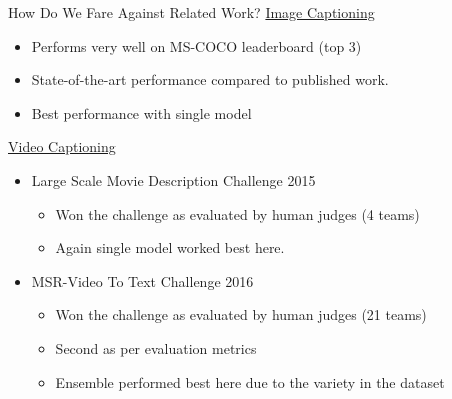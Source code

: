 \documentclass{beamer}
\newcommand{\mct}[1]{\multicolumn{2}{c|}{\bf#1}}
\begin{document}
\begin{frame}{How Do We Fare Against Related Work?}
\underline{Image Captioning}
\begin{itemize}
	\item Performs very well on MS-COCO leaderboard (top 3)
	\item State-of-the-art performance compared to published work.
	\item Best performance with single model 
\end{itemize}
\underline{Video Captioning}
\begin{itemize}
	\item Large Scale Movie Description Challenge 2015
		\begin{itemize}
			\item {Won the challenge} as evaluated by human judges (4 teams)
			\item Again single model worked best here.
		\end{itemize}
	\item MSR-Video To Text Challenge 2016
		\begin{itemize}
			\item {Won the challenge} as evaluated by human judges (21 teams)
			\item Second as per evaluation metrics
			\item Ensemble performed best here due to the variety in the dataset
		\end{itemize}

\end{itemize}

\end{frame}
\end{document}
